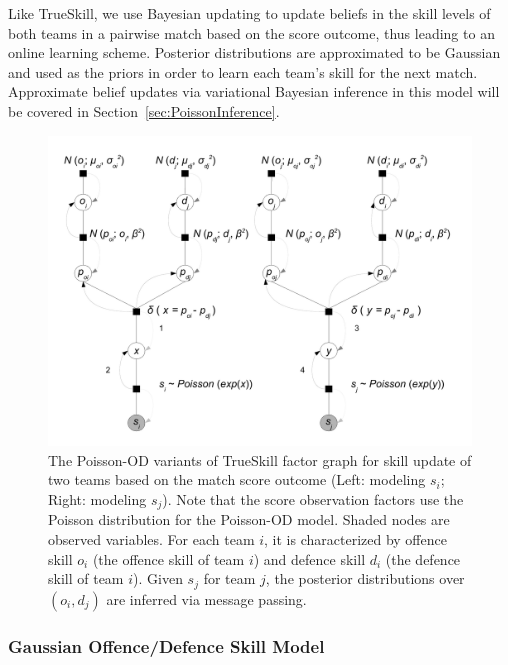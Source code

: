 \unindentmore Like TrueSkill, we use Bayesian updating to update beliefs in the
skill levels of both teams in a pairwise match based on the score
outcome, thus leading to an online learning scheme.  Posterior
distributions are approximated to be Gaussian and used as the
priors in order to learn each team's skill for the next match.
Approximate belief updates via variational Bayesian inference in this model
will be covered in Section~\ref{sec:PoissonInference}.
%
\begin{figure}[t!]
\centerline{\includegraphics[scale=0.28]{modelAndInference}}
\caption{
The Poisson-OD variants of TrueSkill factor graph for skill update of two teams based on the match score outcome (Left: modeling $s_i$; Right: modeling $s_j$). Note that the score observation factors use the Poisson distribution for the Poisson-OD model. Shaded nodes are observed variables. For each team $i$, it is characterized by offence skill $o_{i}$ (the offence skill of team $i$) and defence skill $d_{i}$ (the defence skill of
team $i$). Given $s_j$ for team $j$, the posterior distributions over $(o_i,d_j)$ are inferred via message passing.
}
\label{fig:trueskill_variant}
\end{figure}

\subsubsection{Gaussian Offence/Defence Skill Model}

